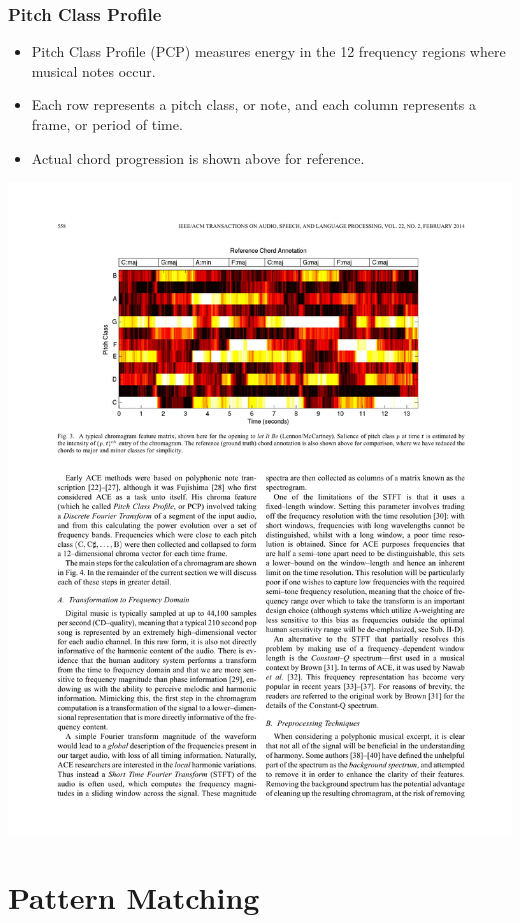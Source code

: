 \documentclass{beamer}
\newcommand{\linespace}{\vskip 0.25cm}
\begin{document}
\begin{frame}
  \frametitle{Pitch Class Profile}
  \begin{itemize}
  \item Pitch Class Profile (PCP) measures energy in the 12 frequency regions where musical notes occur.
  \item Each row represents a pitch class, or note, and each column represents a frame, or period of time.
  \item Actual chord progression is shown above for reference.
  \end{itemize}




 



 \begin{center}
   \includegraphics[width=.70\textwidth]{fig4.pdf}
 \end{center}

\end{frame}



\section[Pattern Matching]{Pattern Matching}
\end{document}
